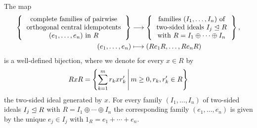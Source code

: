 \begin{theorem}
  \label{theorem: correspondence central idempotents and direct decompositions}
  The map
  \begin{align*}
    \left\{
      \begin{tabular}{c}
        complete families of pairwise \\
        orthogonal central idempotents  \\
        $(e_1, \dotsc, e_n)$ in $R$
      \end{tabular}
    \right\}
    &\longto
      \left\{
      \begin{tabular}{c}
        families $(I_1, \dotsc, I_n)$ of  \\
        two-sided ideals $I_j \idealleq R$ \\
        with $R = I_1 \oplus \dotsb \oplus I_n$
      \end{tabular}
      \right\},
    \\
                  (e_1, \dotsc, e_n)
    &\longmapsto  (R e_1 R, \dotsc, R e_n R)
  \end{align*}
  is a well-defined bijection, where we denote for every $x \in R$ by
  \[
      R x R
    = \left\{
        \sum_{k=1}^m r_k x r'_k
      \suchthat*
        m \geq 0,
        r_k, r'_k \in R
      \right\}
  \]
  the two-sided ideal generated by $x$.
  For every family  $(I_1, \dotsc, I_n)$ of two-sided ideals $I_j \trianglelefteq R$ with $R = I_1 \oplus \dotsb \oplus I_n$ the corresponding family $(e_1, \dotsc, e_n)$ is given by the unique $e_j \in I_j$ with $1_R = e_1 + \dotsb + e_n$.
\end{theorem}






